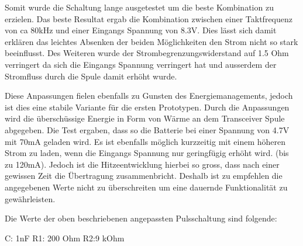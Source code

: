 Somit wurde die Schaltung lange ausgetestet um die beste Kombination zu erzielen. Das beste Resultat ergab die Kombination zwischen einer Taktfrequenz von ca 80kHz und einer Eingangs Spannung von 8.3V. Dies lässt sich damit erklären das leichtes Absenken der beiden Möglichkeiten den Strom nicht so stark beeinflusst. Des Weiteren wurde der Strombegrenzungswiderstand auf 1.5 Ohm verringert da sich die Eingangs Spannung verringert hat und ausserdem der Stromfluss durch die Spule damit erhöht wurde. 

Diese Anpassungen fielen ebenfalls zu Gunsten des Energiemanagements, jedoch ist dies eine stabile Variante für die ersten Prototypen. Durch die Anpassungen wird die überschüssige Energie in Form von Wärme an dem Transceiver Spule abgegeben. Die Test ergaben, dass so die Batterie bei einer Spannung von 4.7V mit 70mA geladen wird. Es ist ebenfalls möglich kurzzeitig mit einem höheren Strom zu laden, wenn die Eingangs Spannung nur geringfügig erhöht wird. (bis zu 120mA). Jedoch ist die Hitzeentwicklung hierbei so gross, dass nach einer gewissen Zeit die Übertragung zusammenbricht. Deshalb ist zu empfehlen die angegebenen Werte nicht zu überschreiten um eine dauernde Funktionalität zu gewährleisten.

Die Werte der oben beschriebenen angepassten Pulsschaltung sind folgende:

\begin{center}
C: 1nF
R1: 200 Ohm
R2:9 kOhm
\end{center}

